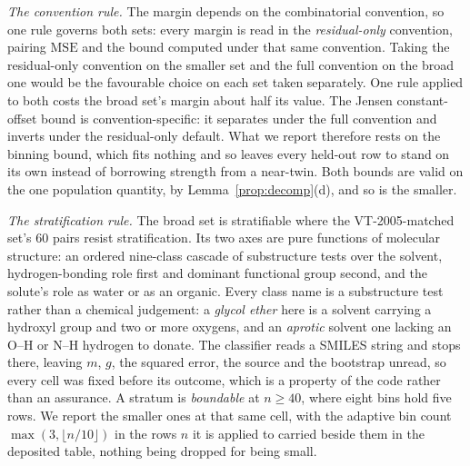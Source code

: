 \emph{The convention rule.} The margin depends on the combinatorial convention, so one rule governs
both sets: every margin is read in the \emph{residual-only} convention, pairing
$\mathrm{MSE}$ and the bound computed under that same convention. Taking the residual-only convention on
the smaller set and the full convention on the broad one would be the favourable choice on each set
taken separately.
One rule applied to both costs the broad set's margin about half its value. The Jensen
constant-offset bound is convention-specific: it separates under the full convention and inverts
under the residual-only default. What we report therefore rests on the binning
bound, which fits nothing and so leaves every held-out row to stand on its own instead of
borrowing strength from a near-twin. Both bounds
are valid on the one population quantity, by Lemma~\ref{prop:decomp}(d), and so is the smaller.

\emph{The stratification rule.} The broad set is stratifiable where the VT-2005-matched set's $60$
pairs resist stratification. Its two axes are pure functions of molecular structure: an ordered
nine-class cascade of substructure tests over the solvent, hydrogen-bonding role first and dominant
functional group second, and the solute's role as water or as an organic. Every class name is a substructure
test rather than a chemical judgement: a \emph{glycol ether} here is a solvent carrying a hydroxyl group
and two or more oxygens, and an \emph{aprotic} solvent one lacking an O--H or N--H hydrogen to donate.
The classifier reads a SMILES string
and stops there, leaving $m$, $g$, the squared error, the source and the bootstrap unread, so every
cell was fixed before its outcome, which is a property of the code rather than an assurance. A stratum
is \emph{boundable} at $n\ge40$, where eight bins hold five rows. We report the smaller ones at
that same cell, with the adaptive bin count $\max(3,\lfloor n/10\rfloor)$ in the rows $n$ it is
applied to carried beside them in the deposited table, nothing being dropped for being small.

